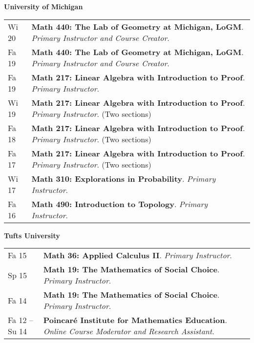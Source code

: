     \vspace{-1em}
    

    \textbf{\large University of Michigan}
    
    \begin{center}
    {
    \renewcommand{\arraystretch}{1.2}
    \begin{longtable}{p{}  p{}}
      Wi 20 & \textbf{{\normalfont Math 440:} The Lab of Geometry at Michigan, LoGM}. \textit{Primary Instructor and Course Creator}.  \\ 
  Fa 19 & \textbf{{\normalfont Math 440:} The Lab of Geometry at Michigan, LoGM}. \textit{Primary Instructor and Course Creator}.  \\ 
  Fa 19 & \textbf{{\normalfont Math 217:} Linear Algebra with Introduction to Proof}. \textit{Primary Instructor}.  \\ 
  Wi 19 & \textbf{{\normalfont Math 217:} Linear Algebra with Introduction to Proof}. \textit{Primary Instructor}. (Two sections) \\ 
  Fa 18 & \textbf{{\normalfont Math 217:} Linear Algebra with Introduction to Proof}. \textit{Primary Instructor}. (Two sections) \\ 
  Fa 17 & \textbf{{\normalfont Math 217:} Linear Algebra with Introduction to Proof}. \textit{Primary Instructor}. (Two sections) \\ 
  Wi 17 & \textbf{{\normalfont Math 310:} Explorations in Probability}. \textit{Primary Instructor}.  \\ 
  Fa 16 & \textbf{{\normalfont Math 490:} Introduction to Topology}. \textit{Primary Instructor}.  
    \end{longtable}
    } 
    \end{center}

    \vspace{-1em}
    

    \textbf{\large Tufts University}
    
    \begin{center}
    {
    \renewcommand{\arraystretch}{1.2}
    \begin{longtable}{p{}  p{}}
      Fa 15 & \textbf{{\normalfont Math 36:} Applied Calculus II}. \textit{Primary Instructor}.  \\ 
  Sp 15 & \textbf{{\normalfont Math 19:} The Mathematics of Social Choice}. \textit{Primary Instructor}.  \\ 
  Fa 14 & \textbf{{\normalfont Math 19:} The Mathematics of Social Choice}. \textit{Primary Instructor}.  \\ 
  Fa 12 --   Su 14 & \textbf{Poincar\'e Institute for Mathematics Education}. \textit{Online Course Moderator and Research Assistant}.  
    \end{longtable}
    } 
    \end{center}

    \vspace{-1em}
    